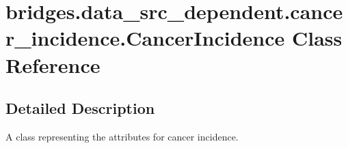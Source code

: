 \hypertarget{classbridges_1_1data__src__dependent_1_1cancer__incidence_1_1_cancer_incidence}{}\section{bridges.\+data\+\_\+src\+\_\+dependent.\+cancer\+\_\+incidence.\+Cancer\+Incidence Class Reference}
\label{classbridges_1_1data__src__dependent_1_1cancer__incidence_1_1_cancer_incidence}


\subsection{Detailed Description}
A class representing the attributes for cancer incidence. 

